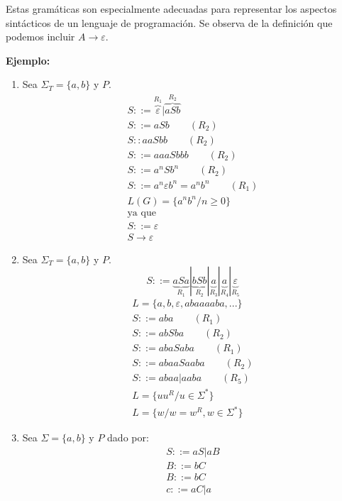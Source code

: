 Estas gramáticas son especialmente adecuadas para representar los aspectos sintácticos de un lenguaje de programación. Se observa de la definición que podemos incluir $A\rightarrow\varepsilon$.

\textbf{Ejemplo: }
\begin{enumerate}
\item Sea $\Sigma_T=\{a,b\}$ y $P$.
\begin{align*}
S::=\overbrace{\varepsilon}^{R_1}|\overbrace{aSb}^{R_2}	\\
S::=aSb\qquad(R_2)	\\
S::aaSbb\qquad(R_2)	\\
S::=aaaSbbb\qquad(R_2)	\\
S::=a^nSb^n\qquad(R_2)	\\
S::=a^n\varepsilon b^n=a^nb^n\qquad(R_1)	\\
L(G)=\{a^nb^n/n\geq 0\}	\\
\mbox{ya que }	\\
S::=\varepsilon	\\
S\rightarrow\varepsilon
\end{align*}
\item Sea $\Sigma_T=\{a,b\}$ y $P$.
$$S::=\underbrace{aSa}_{R_1}|\underbrace{bSb}_{R_2}|\underbrace{a}_{R_3}|\underbrace{a}_{R_4}|\underbrace{\varepsilon}_{R_5}$$
\begin{align*}
L=\{a,b,\varepsilon,abaaaaba,...\}	\\
S::=aba\qquad(R_1)	\\
S::=abSba\qquad(R_2)	\\
S::=abaSaba\qquad(R_1)	\\
S::=abaaSaaba\qquad(R_2)	\\
S::=abaa|aaba\qquad(R_5)	\\
L=\{uu^R/u\in\Sigma^*\}	\\
L=\{w/w=w^R,w\in\Sigma^*\}
\end{align*}
\item Sea $\Sigma=\{a,b\}$ y $P$ dado por:
\begin{align*}
S::=aS|aB	\\
B::=bC	\\
B::=bC	\\
c::=aC|a
\end{align*}
\end{enumerate}